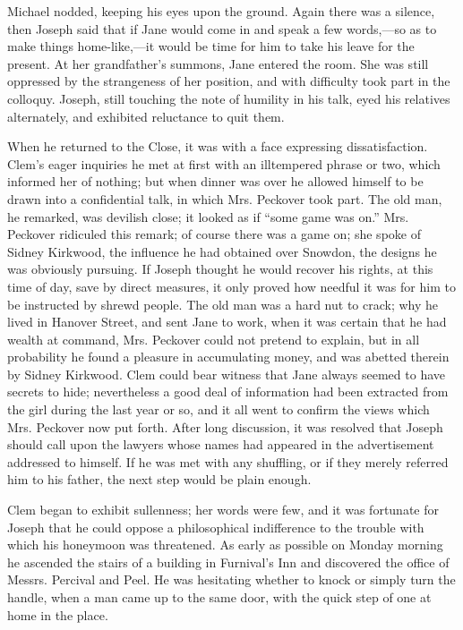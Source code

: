 Michael nodded, keeping his eyes upon the ground. Again there was a
silence, then Joseph said that if Jane would come in and speak a few
words,---so as to make things home-like,---it would be time for him to
take his leave for the present. At her grandfather's summons, Jane
entered the room. She was still oppressed by the strangeness of her
position, and with difficulty took part in the colloquy. Joseph, still
touching the note of humility in his talk, eyed his relatives
alternately, and exhibited reluctance to quit them.

When he returned to the Close, it was with a face expressing
dissatisfaction. Clem's eager inquiries he met at first with an
illtempered phrase or two, which informed her of nothing; but when
dinner was over he allowed himself to be drawn into a confidential talk,
in which Mrs. Peckover took part. The old man, he remarked, was devilish
{\protect\hypertarget{86}{}{}}close; it looked as if ``some game was
on.'' Mrs. Peckover ridiculed this remark; of course there was a game
on; she spoke of Sidney Kirkwood, the influence he had obtained over
Snowdon, the designs he was obviously pursuing. If Joseph thought he
would recover his rights, at this time of day, save by direct measures,
it only proved how needful it was for him to be instructed by shrewd
people. The old man was a hard nut to crack; why he lived in Hanover
Street, and sent Jane to work, when it was certain that he had wealth at
command, Mrs. Peckover could not pretend to explain, but in all
probability he found a pleasure in accumulating money, and was abetted
therein by Sidney Kirkwood. Clem could bear witness that Jane always
seemed to have secrets to hide; nevertheless a good deal of information
had been extracted from the girl during the last year or so, and it all
went to confirm the views which Mrs. Peckover now put forth. After long
discussion, it was resolved that Joseph should call upon the lawyers
whose {\protect\hypertarget{87}{}{}}names had appeared in the
advertisement addressed to himself. If he was met with any shuffling, or
if they merely referred him to his father, the next step would be plain
enough.

Clem began to exhibit sullenness; her words were few, and it was
fortunate for Joseph that he could oppose a philosophical indifference
to the trouble with which his honeymoon was threatened. As early as
possible on Monday morning he ascended the stairs of a building in
Furnival's Inn and discovered the office of Messrs. Percival and Peel.
He was hesitating whether to knock or simply turn the handle, when a man
came up to the same door, with the quick step of one at home in the
place.

